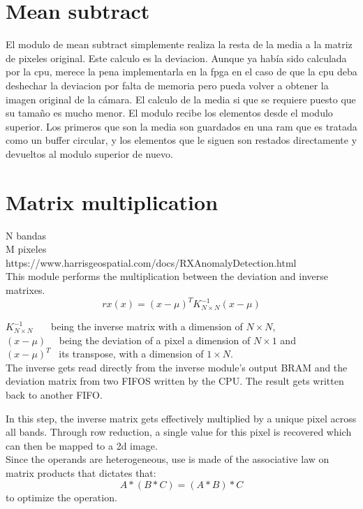 \section{Mean subtract}
El modulo de mean subtract simplemente realiza la resta de la media a la matriz de pixeles original. Este calculo es la deviacion. Aunque ya había sido calculada por la cpu, merece la pena implementarla en la fpga en el caso de que la cpu deba deshechar la deviacion por falta de memoria pero pueda volver a obtener la imagen original de la cámara. El calculo de la media si que se requiere puesto que su tamaño es mucho menor.
El modulo recibe los elementos desde el modulo superior. Los primeros que son la media son guardados en una ram que es tratada como un buffer circular, y los elementos que le siguen son restados directamente y devueltos al modulo superior de nuevo.


\section{Matrix multiplication}

N bandas\\
M pixeles\\
https://www.harrisgeospatial.com/docs/RXAnomalyDetection.html\\

\noindent This module performs the multiplication between the deviation and inverse matrixes.
\[ rx(x) = (x-\mu)^{T} K^{-1}_{N \times N} (x-\mu) \]


\indent \(K^{-1}_{N \times N}\) \ \ \ being the inverse matrix with a dimension of \(N \times N\),\\
\indent \((x-\mu)\) \ \	being the deviation of a pixel a dimension of \(N \times 1\) and \\			
\indent \((x-\mu)^{T}\) \ its transpose, with a dimension of \(1 \times N\).\\

The inverse gets read directly from the inverse module's output BRAM and the deviation matrix from two  FIFOS written by the CPU. The result gets written back to another FIFO.

In this step, the inverse matrix gets effectively multiplied by a unique pixel across all bands. Through row reduction, a single value for this pixel is recovered which can then be mapped to a 2d image.\\

Since the operands are heterogeneous, use is made of the associative law on matrix products that dictates that:
	\[A * (B * C) = (A * B) * C\]
	to optimize the operation.\\


